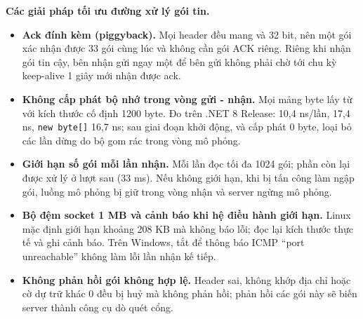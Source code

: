 \textbf{Các giải pháp tối ưu đường xử lý gói tin.}
\begin{itemize}
  \item \textbf{Ack đính kèm (piggyback).} Mọi header đều mang  và  32 bit, nên một gói xác
        nhận được 33 gói cùng lúc và không cần gói ACK riêng. Riêng khi nhận gói tin cậy, bên nhận gửi ngay một
         để bên gửi không phải chờ tới chu kỳ keep-alive 1 giây mới nhận được ack.
  \item \textbf{Không cấp phát bộ nhớ trong vòng gửi - nhận.} Mọi mảng byte lấy từ  với kích thước cố
        định 1200 byte. Đo trên .NET 8 Release:  10,4 ns/lần,  17,4 ns,
        \texttt{new byte[]} 16,7 ns; sau giai đoạn khởi động,  và  cấp phát 0 byte, loại bỏ các lần
        dừng do bộ gom rác trong vòng mô phỏng.
  \item \textbf{Giới hạn số gói mỗi lần nhận.} Mỗi lần  đọc tối đa 1024 gói; phần còn lại được xử lý ở lượt
        sau (33 ms). Nếu không giới hạn, khi bị tấn công làm ngập gói, luồng mô phỏng bị giữ trong vòng nhận và server
        ngừng mô phỏng.
  \item \textbf{Bộ đệm socket 1 MB và cảnh báo khi hệ điều hành giới hạn.} Linux mặc định giới hạn 
        khoảng 208 KB mà không báo lỗi;  đọc lại kích thước thực tế và ghi cảnh báo. Trên Windows, tắt
         để thông báo ICMP ``port unreachable'' không làm lỗi lần nhận kế tiếp.
  \item \textbf{Không phản hồi gói không hợp lệ.} Header sai,  không khớp địa chỉ hoặc cờ dự trữ khác 0
        đều bị huỷ mà không phản hồi; phản hồi các gói này sẽ biến server thành công cụ dò quét cổng.
\end{itemize}

